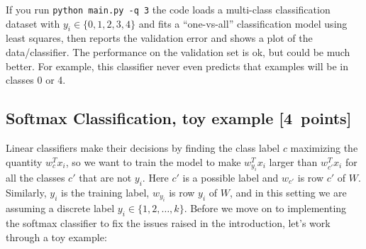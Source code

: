 \documentclass{article}
\newcommand\pts[1]{\textcolor{pointscolour}{[#1~points]}}
\begin{document}
If you run \verb|python main.py -q 3| the code loads a multi-class
classification dataset with $y_i \in \{0,1,2,3,4\}$ and fits a ``one-vs-all'' classification
model using least squares, then reports the validation error and shows a plot of the data/classifier.
The performance on the validation set is ok, but could be much better.
For example, this classifier never even predicts that examples will be in classes 0 or 4.


\subsection{Softmax Classification, toy example \pts{4}}

Linear classifiers make their decisions by finding the class label $c$ maximizing the quantity $w_c^Tx_i$, so we want to train the model to make $w_{y_i}^Tx_i$ larger than $w_{c'}^Tx_i$ for all the classes $c'$ that are not $y_i$.
Here $c'$ is a possible label and $w_{c'}$ is row $c'$ of $W$. Similarly, $y_i$ is the training label, $w_{y_i}$ is row $y_i$ of $W$, and in this setting we are assuming a discrete label $y_i \in \{1,2,\dots,k\}$. Before we move on to implementing the softmax classifier to fix the issues raised in the introduction, let's work through a toy example:
\end{document}
